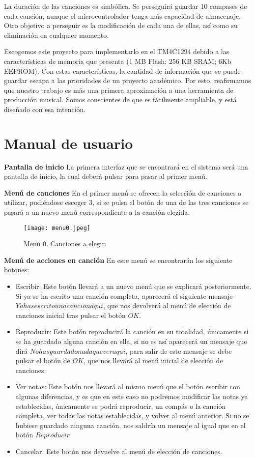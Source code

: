 \documentclass[12pt,a4paper]{article}
\begin{document}
La duración de las canciones es simbólica. Se perseguirá guardar 10 compases de cada canción, aunque el microcontrolador tenga más capacidad de almacenaje. Otro objetivo a perseguir es la modificación de cada una de ellas, así como su eliminación en cualquier momento. 


Escogemos este proyecto para implementarlo en el TM4C1294 debido a las características de memoria que presenta (1 MB Flash; 256 KB SRAM; 6Kb EEPROM). Con estas características, la cantidad de información que se puede guardar escapa a las prioridades de un proyecto académico. Por esto, reafirmamos que nuestro trabajo es más una primera aproximación a una herramienta de producción musical. Somos conscientes de que es fácilmente ampliable, y está diseñado con esa intención.


\section{Manual de usuario}
\textbf{Pantalla de inicio}
La primera interfaz que se encontrará en el sistema será una pantalla de inicio, la cual deberá pulsar para pasar al primer menú.

\textbf{Menú de canciones}
En el primer menú se ofrecen la selección de canciones a utilizar, pudiéndose escoger 3, si se pulsa el botón de una de las tres canciones se pasará a un nuevo menú correspondiente a la canción elegida.

\begin{figure}[h!]
\centering
  \texttt{[image: menu0.jpeg]}
  \caption{Menú 0. Canciones a elegir.}
  \label{fig:img1}
\end{figure}

\textbf{Menú de acciones en canción}
En este menú se encontrarán los siguiente botones:
\begin{itemize}
\item Escribir: Este botón llevará a un nuevo menú que se explicará posteriormente. Si ya se ha escrito una canción completa, aparecerá el siguiente mensaje $Ya has escrito una cancion aqui$, que nos devolverá al menú de elección de canciones inicial tras pulsar el botón $OK$.
\item Reproducir: Este botón reproducirá la canción en su totalidad, únicamente si se ha guardado alguna canción en ella, si no es así aparecerá un mensaje que dirá $No has guardado nada que ver aqui$, para salir de este mensaje se debe pulsar el botón de $OK$, que nos llevará al menú inicial de elección de canciones.
\item Ver notas: Este botón nos llevará al mismo menú que el botón escribir con algunas diferencias, y es que en este caso no podremos modificar las notas ya establecidas, únicamente se podrá reproducir, un compás o la canción completa, ver todas las notas establecidas, y volver al menú anterior. Si no se hubiese guardado ninguna canción, nos saldría un mensaje al igual que en el botón $Reproducir$
\item Cancelar: Este botón nos devuelve al menú de elección de canciones.
\end{itemize}
\end{document}
